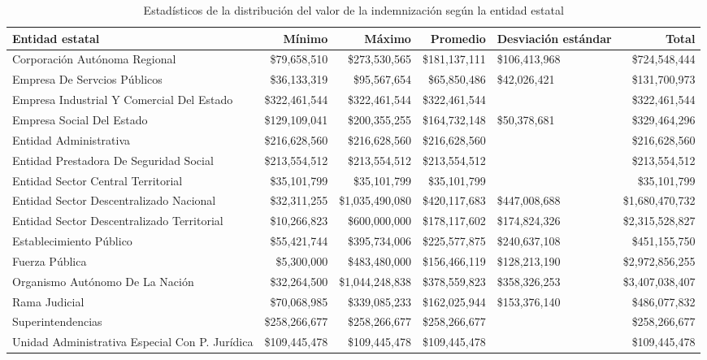 \begin{sidewaystable}[htbp]
\centering
\caption{Estadísticos de la distribución del
valor de la indemnización según la entidad estatal} 
\label{tab:indemnizacion-entidad}
\begin{tabular}{lrrrR{2cm}r}
  \hline
Entidad estatal & Mínimo & Máximo & Promedio & Desviación estándar & Total \\ 
  \hline
Corporación Autónoma Regional & \$79,658,510 & \$273,530,565 & \$181,137,111 & \$106,413,968 & \$724,548,444 \\ 
  Empresa De Servcios Públicos & \$36,133,319 & \$95,567,654 & \$65,850,486 & \$42,026,421 & \$131,700,973 \\ 
  Empresa Industrial Y Comercial Del Estado & \$322,461,544 & \$322,461,544 & \$322,461,544 &  & \$322,461,544 \\ 
  Empresa Social Del Estado & \$129,109,041 & \$200,355,255 & \$164,732,148 & \$50,378,681 & \$329,464,296 \\ 
  Entidad Administrativa & \$216,628,560 & \$216,628,560 & \$216,628,560 &  & \$216,628,560 \\ 
  Entidad Prestadora De Seguridad Social & \$213,554,512 & \$213,554,512 & \$213,554,512 &  & \$213,554,512 \\ 
  Entidad Sector Central Territorial & \$35,101,799 & \$35,101,799 & \$35,101,799 &  & \$35,101,799 \\ 
  Entidad Sector Descentralizado Nacional & \$32,311,255 & \$1,035,490,080 & \$420,117,683 & \$447,008,688 & \$1,680,470,732 \\ 
  Entidad Sector Descentralizado Territorial & \$10,266,823 & \$600,000,000 & \$178,117,602 & \$174,824,326 & \$2,315,528,827 \\ 
  Establecimiento Público & \$55,421,744 & \$395,734,006 & \$225,577,875 & \$240,637,108 & \$451,155,750 \\ 
  Fuerza Pública & \$5,300,000 & \$483,480,000 & \$156,466,119 & \$128,213,190 & \$2,972,856,255 \\ 
  Organismo Autónomo De La Nación & \$32,264,500 & \$1,044,248,838 & \$378,559,823 & \$358,326,253 & \$3,407,038,407 \\ 
  Rama Judicial & \$70,068,985 & \$339,085,233 & \$162,025,944 & \$153,376,140 & \$486,077,832 \\ 
  Superintendencias & \$258,266,677 & \$258,266,677 & \$258,266,677 &  & \$258,266,677 \\ 
  Unidad Administrativa Especial Con P. Jurídica & \$109,445,478 & \$109,445,478 & \$109,445,478 &  & \$109,445,478 \\ 
   \hline
\end{tabular}
\end{sidewaystable}
